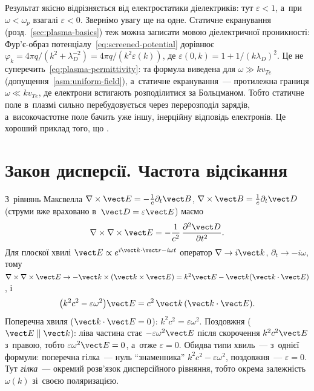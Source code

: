 Результат якісно відрізняється від електростатики діелектриків: тут $\varepsilon<1$, а~при
$\omega<\omega_p$ взагалі $\varepsilon<0$. Звернімо увагу ще на одне. Статичне екранування
(розд.~\ref{sec:plasma-basics}) теж можна записати мовою діелектричної проникності: Фур'є-образ
потенціалу~\eqref{eq:screened-potential} дорівнює $\varphi_k=4\pi
q/(k^2+\lambda_D^{-2})=4\pi q/(k^2\varepsilon(k))$, де
$\varepsilon(0,k)=1+1/(k\lambda_D)^2$. Це не суперечить~\eqref{eq:plasma-permittivity}: та формула виведена для $\omega\gg kv_{Te}$ (допущення~\ref{asm:uniform-field}), а~статичне екранування~--- протилежна границя $\omega\ll kv_{Te}$, де електрони встигають розподілитися за Больцманом. Тобто статичне поле в~плазмі сильно перебудовується
через перерозподіл зарядів, а~високочастотне поле бачить уже іншу, інерційну відповідь
електронів. Це хороший приклад того, що .

\section{Закон дисперсії. Частота відсікання}\label{sec:dispersion}

\begin{Theory}
З~рівнянь Максвелла $\nabla\times\vect E=-\frac1c\partial_t\vect B$,
$\nabla\times\vect B=\frac1c\partial_t\vect D$ (струми вже враховано в~$\vect D=\varepsilon\vect E$) маємо
\[\nabla\times\nabla\times\vect E=-\frac1{c^2}\,\frac{\partial^2\vect D}{\partial t^2}.\]
Для плоскої хвилі $\vect E\propto e^{i\vect k\cdot\vect r-i\omega t}$ оператор $\nabla\to i\vect k$,
$\partial_t\to-i\omega$, тому $\nabla\times\nabla\times\vect E\to-\vect k\times(\vect k\times\vect E)=k^2\vect E-\vect k(\vect k\cdot\vect E)$,
і~
\begin{equation}\label{eq:wave-master}
\bigl(k^2c^2-\varepsilon\omega^2\bigr)\vect E=c^2\,\vect k\,(\vect k\cdot\vect E).
\end{equation}
Поперечна хвиля ($\vect k\cdot\vect E=0$): $k^2c^2=\varepsilon\omega^2$. Поздовжня ($\vect E\parallel\vect k$):
ліва частина стає $-\varepsilon\omega^2\vect E$ після скорочення $k^2c^2\vect E$ з~правою, тобто $\varepsilon\omega^2\vect E=0$, а~отже $\varepsilon=0$.
Обидва типи хвиль~--- з~однієї формули: поперечна гілка~--- нуль \enquote{знаменника} $k^2c^2-\varepsilon\omega^2$, поздовжня~--- $\varepsilon=0$.
Тут \emph{гілка}~--- окремий розв'язок дисперсійного рівняння, тобто окрема залежність $\omega(k)$ зі~своєю поляризацією.
\end{Theory}

